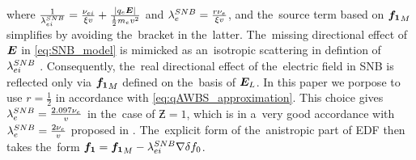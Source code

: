 where $\frac{1}{\lambda_{ei}^{SNB}} = 
\frac{\nu_{ei}}{\xi v} + \frac{|q_e\boldsymbol{E}|}{\frac{1}{2}m_ev^2}$ 
and $\lambda_e^{SNB} = \frac{r \nu_{e}}{\xi v}$, and the~source term based on 
${\boldsymbol{f_1}}_M$ simplifies by avoiding the~bracket in the~latter. The~missing
directional effect of $\boldsymbol{E}$ in \eqref{eq:SNB_model} is mimicked as 
an~isotropic scattering in defintion of $\lambda_{ei}^{SNB}$ \cite{Schurtz_2000}.
Consequently, the~real directional effect of the~electric field in SNB
is reflected only via ${\boldsymbol{f_1}}_M$ defined on the~basis of $\boldsymbol{E}_L$.
In this paper we porpose to use $r = \frac{1}{2}$ in accordance with 
\eqref{eq:qAWBS_approximation}. This choice gives 
$\lambda_e^{SNB} = \frac{2.097\nu_{e}}{v}$ in the~case of $\Zbar = 1$, 
which is in a~very good accordance with $\lambda_e^{SNB} = \frac{2\nu_{e}}{v}$ 
proposed in \cite{Brodrick_PoP2017}. The~explicit form of the~anistropic part of EDF then takes the~form ${\boldsymbol{f_1}} = {\boldsymbol{f_1}}_M - \lambda_{ei}^{SNB}\nabla\delta f_0$.

